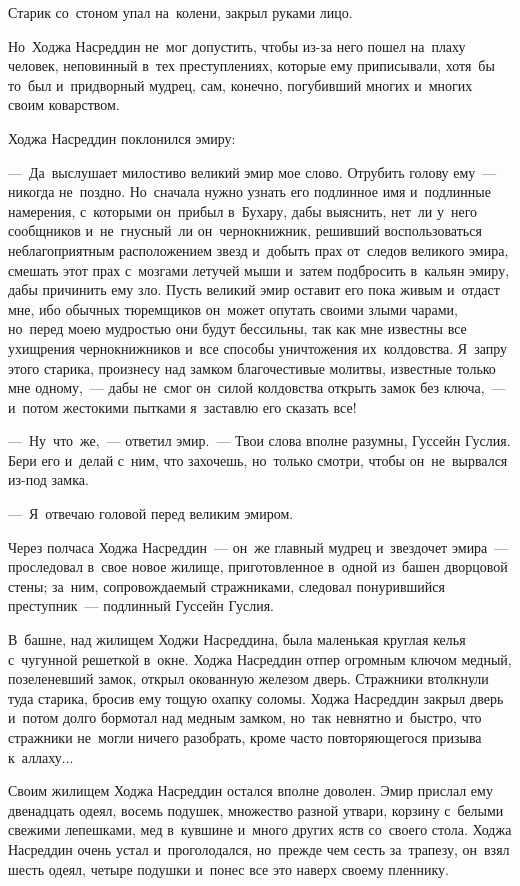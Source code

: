 \documentclass[12pt,a4paper]{book}
\begin{document}
Старик со~стоном упал на~колени, закрыл руками лицо.

Но~Ходжа Насреддин не~мог допустить, чтобы из-за него пошел на~плаху человек, неповинный в~тех преступлениях, которые ему приписывали, хотя~бы то~был и~придворный мудрец, сам, конечно, погубивший многих и~многих своим коварством.

Ходжа Насреддин поклонился эмиру:

—~Да~выслушает милостиво великий эмир мое слово. Отрубить голову ему~— никогда не~поздно. Но~сначала нужно узнать его подлинное имя и~подлинные намерения, с~которыми он~прибыл в~Бухару, дабы выяснить, нет~ли у~него сообщников и~не~гнусный~ли он~чернокнижник, решивший воспользоваться неблагоприятным расположением звезд и~добыть прах от~следов великого эмира, смешать этот прах с~мозгами летучей мыши и~затем подбросить в~кальян эмиру, дабы причинить ему зло. Пусть великий эмир оставит его пока живым и~отдаст мне, ибо обычных тюремщиков он~может опутать своими злыми чарами, но~перед моею мудростью они будут бессильны, так как мне известны все ухищрения чернокнижников и~все способы уничтожения их~колдовства. Я~запру этого старика, произнесу над замком благочестивые молитвы, известные только мне одному,~— дабы не~смог он~силой колдовства открыть замок без ключа,~— и~потом жестокими пытками я~заставлю его сказать все!

—~Ну~что~же,~— ответил эмир.~— Твои слова вполне разумны, Гуссейн Гуслия. Бери его и~делай с~ним, что захочешь, но~только смотри, чтобы он~не~вырвался из-под замка.

—~Я~отвечаю головой перед великим эмиром.

Через полчаса Ходжа Насреддин~— он~же главный мудрец и~звездочет эмира~— проследовал в~свое новое жилище, приготовленное в~одной из~башен дворцовой стены; за~ним, сопровождаемый стражниками, следовал понурившийся преступник~— подлинный Гуссейн Гуслия.

В~башне, над жилищем Ходжи Насреддина, была маленькая круглая келья с~чугунной решеткой в~окне. Ходжа Насреддин отпер огромным ключом медный, позеленевший замок, открыл окованную железом дверь. Стражники втолкнули туда старика, бросив ему тощую охапку соломы. Ходжа Насреддин закрыл дверь и~потом долго бормотал над медным замком, но~так невнятно и~быстро, что стражники не~могли ничего разобрать, кроме часто повторяющегося призыва к~аллаху...

Своим жилищем Ходжа Насреддин остался вполне доволен. Эмир прислал ему двенадцать одеял, восемь подушек, множество разной утвари, корзину с~белыми свежими лепешками, мед в~кувшине и~много других яств со~своего стола. Ходжа Насреддин очень устал и~проголодался, но~прежде чем сесть за~трапезу, он~взял шесть одеял, четыре подушки и~понес все это наверх своему пленнику.
\end{document}
